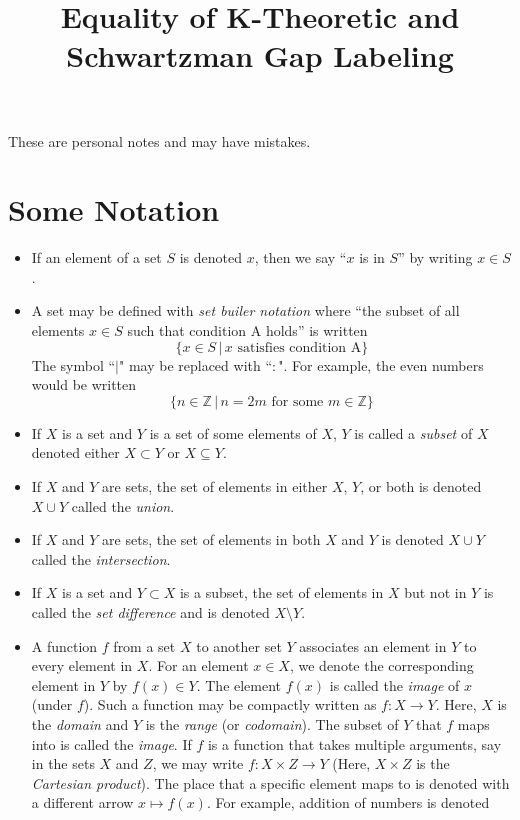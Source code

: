 \documentclass[11pt, reqno]{amsart}
\title{Equality of K-Theoretic and Schwartzman Gap Labeling}
\author{}
\theoremstyle{definition} %
\begin{document}
These are personal notes and may have mistakes.

\section{Some Notation}
\begin{itemize}
    \item If an element of a set $S$ is denoted $x$, then we say ``$x$ is in $S$'' by writing $x\in S$.
    \item A set may be defined with \emph{set builer notation} where ``the subset of all elements $x\in S$ such that condition A holds'' is written 
    \begin{equation}
        \{x\in S\,|\,x\text{ satisfies condition A}\}
    \end{equation}
    The symbol ``$|$" may be replaced with ``$:$". For example, the even numbers would be written
    \begin{equation}
        \{n\in \mathbb{Z}\,|\,n=2m\text{ for some $m\in\mathbb{Z}$}\}
    \end{equation}
    \item If $X$ is a set and $Y$ is a set of some elements of $X$, $Y$ is called a \emph{subset} of $X$ denoted either $X\subset Y$ or $X\subseteq Y$.
    \item If $X$ and $Y$ are sets, the set of elements in either $X$, $Y$, or both is denoted $X\cup Y$ called the \emph{union}.
    \item If $X$ and $Y$ are sets, the set of elements in both $X$ and $Y$ is denoted $X\cup Y$ called the \emph{intersection}.
    \item If $X$ is a set and $Y\subset X$ is a subset, the set of elements in $X$ but not in $Y$ is called the \emph{set difference} and is denoted $X\setminus Y$.
    \item A function $f$ from a set $X$ to another set $Y$ associates an element in $Y$ to every element in $X$. For an element $x\in X$, we denote the corresponding element in $Y$ by $f(x)\in Y$. The element $f(x)$ is called the \emph{image} of $x$ (under $f$). Such a function may be compactly written as $f:X\to Y$. Here, $X$ is the \emph{domain} and $Y$ is the \emph{range} (or \emph{codomain}). The subset of $Y$ that $f$ maps into is called the \emph{image}. If $f$ is a function that takes multiple arguments, say in the sets $X$ and $Z$, we may write $f:X\times Z\to Y$ (Here, $X\times Z$ is the \emph{Cartesian product}). The place that a specific element maps to is denoted with a different arrow $x\mapsto f(x)$. For example, addition of numbers is denoted 

\end{itemize}
\end{document}
